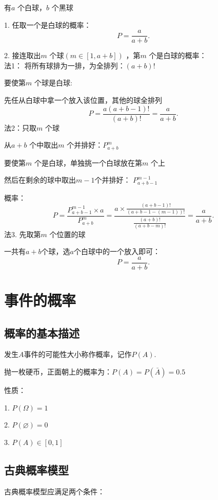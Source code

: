 \begin{eg}
    有$a$ 个白球，$b$ 个黑球

    1. 任取一个是白球的概率：
    \[
        P=\frac{a}{a+b}
    .\] 

    2. 接连取出$m$ 个球$\left( m\in \left[ 1,a+b \right]  \right) $ ，第$m$ 个是白球的概率：\\
    法1： 将所有球排为一排，为全排列：$\left( a+b \right) !$ 
    
    要使第$m$ 个球是白球:

    先任从白球中拿一个放入该位置，其他的球全排列
    \[
        P=\frac{a\left( a+b-1 \right) !}{\left( a+b \right) !}=\frac{a}{a+b}
    .\] 
    法2：只取$m$ 个球

    从$a+b$ 个中取出$m$ 个并排好：$P_{a+b}^{m}$

    要使第$m$ 个是白球，单独挑一个白球放在第$m$ 个上

    然后在剩余的球中取出$m-1$个并排好： $P_{a+b-1}^{m-1}$ 

    概率：
    \[
        P=\frac{P_{a+b-1}^{m-1}\times a}{P_{a+b}^{m}}=\frac{a\times \frac{\left( a+b-1 \right) !}{\left( a+b-1-\left( m-1 \right)  \right) !}}{\frac{\left( a+b \right) !}{\left( a+b-m \right) !}}=\frac{a}{a+b}
    .\] 
    法3. 先取第$m$ 个位置的球

    一共有$a+b$个球，选$a$个白球中的一个放入即可：
    \[
        P=\frac{a}{a+b}
    .\] 
\end{eg}
\section{事件的概率}%
\label{sec:事件的概率}

\subsection{概率的基本描述}%
\label{sub:概率的基本描述}
发生$A$事件的可能性大小称作概率，记作$P\left( A \right) $.
\begin{eg}
   抛一枚硬币，正面朝上的概率为：$P\left( A \right) =P\left( \bar{A} \right) = 0.5$
\end{eg}
性质：

1. $P\left( \Omega \right) =1$ 

2. $P\left( \varnothing \right) =0$ 

3. $P\left( A \right) \in [0,1]$

\subsection{古典概率模型}%
\label{sub:古典概率模型}
古典概率模型应满足两个条件：

